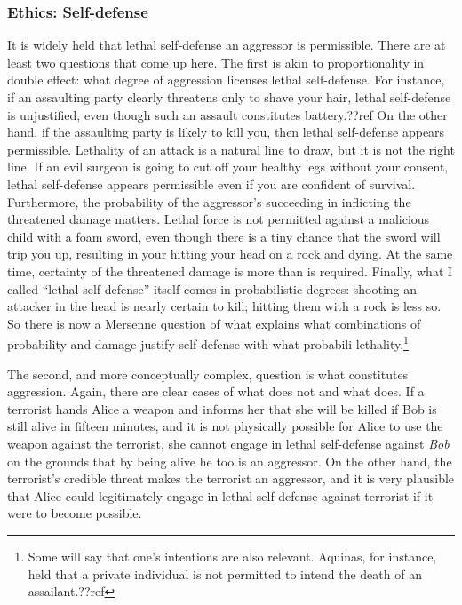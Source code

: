 \subsubsection{Ethics: Self-defense}
It is widely held that lethal self-defense an aggressor is permissible. There are at least two questions that come up here.
The first is akin to proportionality in double effect: what degree of aggression licenses lethal self-defense. For instance, if an assaulting party clearly threatens only to shave your 
hair, lethal self-defense is unjustified, even though such an assault constitutes battery.??ref On the other hand, 
if the assaulting party is likely to kill you, then lethal self-defense appears permissible. 
Lethality of an attack is a natural line to draw, but it is not the right line. If an evil surgeon is going to 
cut off your healthy legs without your consent, lethal self-defense appears permissible even if 
you are confident of survival. Furthermore, the probability of the aggressor's succeeding in inflicting the 
threatened damage matters. Lethal force is not permitted against a malicious child with a foam sword, even though 
there is a tiny chance that the sword will trip you up, resulting in your hitting your head on a rock and dying. 
At the same time, certainty of the threatened damage is more than is required. Finally, what I called 
``lethal self-defense'' itself comes in probabilistic degrees: shooting an attacker in the head is nearly
certain to kill; hitting them with a rock is less so. So there is now a Mersenne question of 
what explains what combinations of probability and damage justify self-defense with what 
probabili lethality.\footnote{Some will say that one's intentions are also
relevant.  Aquinas, for instance, held that a private individual is not permitted to intend the death of 
an assailant.??ref}

The second, and more conceptually complex, question is what constitutes aggression. Again, there are clear cases of what does not 
and what does. If a terrorist hands Alice a weapon and informs her that she will be killed if Bob is still alive in fifteen 
minutes, and it is not physically possible for Alice to use the weapon against the terrorist, she cannot engage in lethal 
self-defense against \textit{Bob} on the grounds that by being alive he too is an aggressor. On the other hand, the terrorist's credible threat 
makes the terrorist an aggressor, and it is very plausible that Alice could legitimately engage in lethal self-defense against terrorist if it were 
to become possible.

